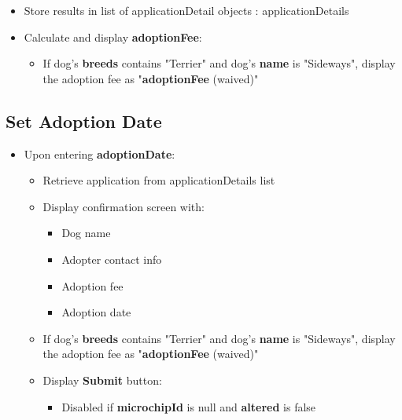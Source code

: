 \documentclass{article}
\begin{document}
\begin{itemize}
\begin{itemize}
\begin{Verbatim} [frame=single]
GROUP BY a.email, a.first_name, a.last_name, a.phone, 
    a.street, a.city, a.state, a.zip, a2.date, d.dogID, 
    d.name 
ORDER BY a2.date DESC
LIMIT 1;
        \end{Verbatim}
        \item Store results in list of applicationDetail objects : applicationDetails
        \item Calculate and display 	\textbf{adoptionFee}:
        \begin{itemize}
            \item If dog's 	\textbf{breeds} contains "Terrier" and dog's 	\textbf{name} is "Sideways", display the adoption fee as "\textbf{adoptionFee} (waived)"
        \end{itemize}
    \end{itemize}
\end{itemize}


\subsection{Set Adoption Date}
\begin{itemize}
\item Upon entering 	\textbf{adoptionDate}:
\begin{itemize}
    \item Retrieve application from applicationDetails list
\end{itemize}
\begin{itemize}
    \item Display confirmation screen with:
    \begin{itemize}
        \item Dog name
        \item Adopter contact info
        \item Adoption fee
        \item Adoption date
    \end{itemize}
    \item If dog's 	\textbf{breeds} contains "Terrier" and dog's 	\textbf{name} is "Sideways", display the adoption fee as "\textbf{adoptionFee} (waived)"
    \item Display 	\textbf{Submit} button:
    \begin{itemize}
        \begin{Verbatim} [frame=single]
SELECT d.dogID, d.name, d.altered, dm.microchipID 
FROM Dog d
LEFT JOIN DogMicrochip dm ON d.dogID = dm.dogID
WHERE d.dogID = @dogID
AND d.altered = FALSE 
AND dm.microchipID IS NULL;
        \end{Verbatim}
        \item Disabled if 	\textbf{microchipId} is null and 	\textbf{altered} is false
    \end{itemize}
\end{itemize}        
\end{itemize}        
\end{document}
